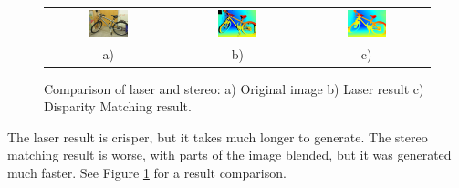 \documentclass[11pt,fleqn]{article}
\begin{document}
\begin{figure}[!ht]
\begin{mdframed}
\centering
\setlength{}
\begin{tabular}{ccc}
\includegraphics[width=0.33\textwidth]{images/_im0-600.jpg} &
\includegraphics[width=0.33\textwidth]{images/disp0GT-600.jpg} &
\includegraphics[width=0.33\textwidth]{images/_disp-600.jpg} \\[2pt]
a) & b) & c) \\
\end{tabular}
\caption[Comparison of laser and stereo]{Comparison of laser and stereo: a) Original image b) Laser result c) Disparity Matching result.}
\label{fig:result1}
\end{mdframed}
\end{figure}

The laser result is crisper, but it takes much longer to generate. The stereo matching result is worse, with parts of the image blended, but it was generated much faster. See Figure \ref{fig:result1} for a result comparison.
\end{document}
